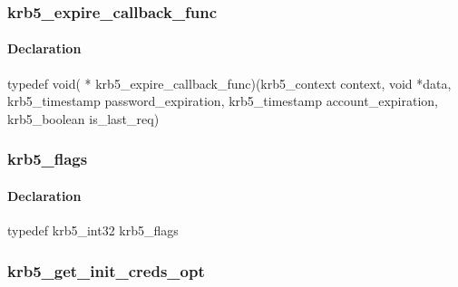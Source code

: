 \documentclass[letterpaper,10pt,english]{sphinxmanual}
\begin{document}
\subsubsection{krb5\_expire\_callback\_func}
\label{appdev/refs/types/krb5_expire_callback_func:krb5-expire-callback-func}\label{appdev/refs/types/krb5_expire_callback_func::doc}\label{appdev/refs/types/krb5_expire_callback_func:krb5-expire-callback-func-struct}

\begin{fulllineitems}
\label{appdev/refs/types/krb5_expire_callback_func:c.krb5_expire_callback_func}
\end{fulllineitems}



\paragraph{Declaration}
\label{appdev/refs/types/krb5_expire_callback_func:declaration}
typedef void( * krb5\_expire\_callback\_func)(krb5\_context context, void *data, krb5\_timestamp password\_expiration, krb5\_timestamp account\_expiration, krb5\_boolean is\_last\_req)


\subsubsection{krb5\_flags}
\label{appdev/refs/types/krb5_flags:krb5-flags-struct}\label{appdev/refs/types/krb5_flags:krb5-flags}\label{appdev/refs/types/krb5_flags::doc}

\begin{fulllineitems}
\label{appdev/refs/types/krb5_flags:c.krb5_flags}
\end{fulllineitems}



\paragraph{Declaration}
\label{appdev/refs/types/krb5_flags:declaration}
typedef krb5\_int32 krb5\_flags


\subsubsection{krb5\_get\_init\_creds\_opt}
\label{appdev/refs/types/krb5_get_init_creds_opt:krb5-get-init-creds-opt-struct}\label{appdev/refs/types/krb5_get_init_creds_opt::doc}\label{appdev/refs/types/krb5_get_init_creds_opt:krb5-get-init-creds-opt}
\end{document}
